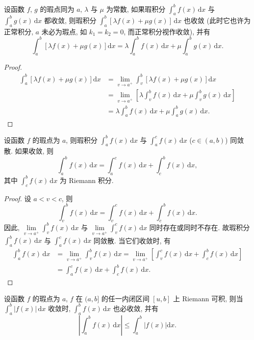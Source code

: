 \begin{lemma}\label{lem:6.5.4}
设函数 $f$, $g$ 的瑕点同为 $a$, $\lambda$ 与 $\mu$ 为常数, 如果瑕积分 $\int_{a}^{b}f(x)\,\mathrm{d}x$ 与 $\int_{a}^{b}g(x)\,\mathrm{d}x$ 都收敛, 则瑕积分 $\int_{a}^{b}[\lambda f(x)+\mu g(x)]\,\mathrm{d}x$ 也收敛 (此时它也许为正常积分, $a$ 未必为瑕点, 如 $k_{1}=k_{2}=0$, 而正常积分视作收敛), 并有
\[
\int_{a}^{b}\left[\lambda f(x)+\mu g(x)\right]\mathrm{d}x=\lambda\int_{a}^{b}f(x)\,\mathrm{d}x+\mu\int_{a}^{b}g(x)\,\mathrm{d}x.
\]
\end{lemma}

\begin{proof}
\begin{align*}
\int_{a}^{b}\left[\lambda f(x)+\mu g(x)\right]\mathrm{d}x&=\lim_{v\to a^{+}}\int_{v}^{b}\left[\lambda f(x)+\mu g(x)\right]\mathrm{d}x\\
&=\lim_{v\to a^{+}}\left[\lambda\int_{v}^{b}f(x)\,\mathrm{d}x+\mu\int_{v}^{b}g(x)\,\mathrm{d}x\right]\\
&=\lambda\int_{a}^{b}f(x)\,\mathrm{d}x+\mu\int_{a}^{b}g(x)\,\mathrm{d}x.
\end{align*}
\end{proof}

\begin{lemma}\label{lem:6.5.5}
设函数 $f$ 的瑕点为 $a$, 则瑕积分 $\int_{a}^{b}f(x)\,\mathrm{d}x$ 与 $\int_{a}^{c}f(x)\,\mathrm{d}x$ ($c\in(a,b)$) 同敛散. 如果收敛, 则
\[
\int_{a}^{b}f(x)\,\mathrm{d}x=\int_{a}^{c}f(x)\,\mathrm{d}x+\int_{c}^{b}f(x)\,\mathrm{d}x,
\]
其中 $\int_{c}^{b}f(x)\,\mathrm{d}x$ 为 Riemann 积分.
\end{lemma}

\begin{proof}
设 $a<v<c$, 则
\[
\int_{v}^{b}f(x)\,\mathrm{d}x=\int_{v}^{c}f(x)\,\mathrm{d}x+\int_{c}^{b}f(x)\,\mathrm{d}x.
\]
因此, $\lim\limits_{v\to a^{+}}\int_{v}^{b}f(x)\,\mathrm{d}x$ 与 $\lim\limits_{v\to a^{+}}\int_{v}^{c}f(x)\,\mathrm{d}x$ 同时存在或同时不存在. 故瑕积分 $\int_{a}^{b}f(x)\,\mathrm{d}x$ 与 $\int_{a}^{c}f(x)\,\mathrm{d}x$ 同敛散. 当它们收敛时, 有
\begin{align*}
\int_{a}^{b}f(x)\,\mathrm{d}x&=\lim_{v\to a^{+}}\int_{v}^{b}f(x)\,\mathrm{d}x=\lim_{v\to a^{+}}\left[\int_{v}^{c}f(x)\,\mathrm{d}x+\int_{c}^{b}f(x)\,\mathrm{d}x\right]\\
&=\int_{a}^{c}f(x)\,\mathrm{d}x+\int_{c}^{b}f(x)\,\mathrm{d}x.
\end{align*}
\end{proof}

\begin{lemma}\label{lem:6.5.6}
设函数 $f$ 的瑕点为 $a$, $f$ 在 $(a,b]$ 的任一内闭区间 $[u,b]$ 上 Riemann 可积, 则当 $\int_{a}^{b}|f(x)|\,\mathrm{d}x$ 收敛时, $\int_{a}^{b}f(x)\,\mathrm{d}x$ 也必收敛, 并有
\[
\left|\int_{a}^{b}f(x)\,\mathrm{d}x\right|\leqslant\int_{a}^{b}\left|f(x)\right|\mathrm{d}x.
\]
\end{lemma}

